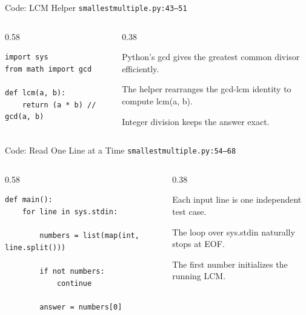 \documentclass[aspectratio=169,11pt]{beamer}
\begin{document}
\begin{frame}[fragile]{Code: LCM Helper}
\scriptsize
{} \texttt{smallestmultiple.py:43--51}

\vspace{0.08cm}
\begin{columns}[T,totalwidth=\textwidth]
\begin{column}{0.58\textwidth}
\begin{lstlisting}[style=cpcode]
import sys
from math import gcd

def lcm(a, b):
    return (a * b) // gcd(a, b)
\end{lstlisting}
\end{column}
\begin{column}{0.38\textwidth}
\begin{tightitemize}
  \item Python's gcd gives the greatest common divisor efficiently.
  \item The helper rearranges the gcd-lcm identity to compute lcm(a, b).
  \item Integer division keeps the answer exact.
\end{tightitemize}
\end{column}
\end{columns}
\end{frame}

\begin{frame}[fragile]{Code: Read One Line at a Time}
\scriptsize
{} \texttt{smallestmultiple.py:54--68}

\vspace{0.08cm}
\begin{columns}[T,totalwidth=\textwidth]
\begin{column}{0.58\textwidth}
\begin{lstlisting}[style=cpcode]
def main():
    for line in sys.stdin:

        numbers = list(map(int, line.split()))

        if not numbers:
            continue

        answer = numbers[0]
\end{lstlisting}
\end{column}
\begin{column}{0.38\textwidth}
\begin{tightitemize}
  \item Each input line is one independent test case.
  \item The loop over sys.stdin naturally stops at EOF.
  \item The first number initializes the running LCM.
\end{tightitemize}
\end{column}
\end{columns}
\end{frame}
\end{document}
